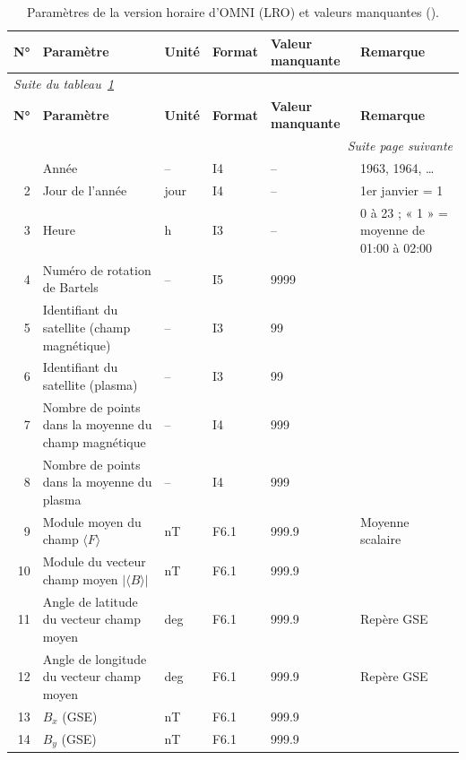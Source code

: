 \begingroup
\footnotesize
\setlength{\tabcolsep}{3pt}
\renewcommand{\arraystretch}{1.1}
\begin{longtable}{r p{5.0cm} p{2.0cm} l l p{3.3cm}}
\caption{Paramètres de la version horaire d'OMNI (LRO) et valeurs manquantes (\cite{OMNI_LRO_doc}).}
\label{tab:annexe_lro}\\
\hline
\textbf{N°} & \textbf{Paramètre} & \textbf{Unité} & \textbf{Format} & \textbf{Valeur manquante} & \textbf{Remarque} \\
\hline
\endfirsthead
\multicolumn{6}{l}{\textit{Suite du tableau~\ref{tab:annexe_lro}}} \\
\hline
\textbf{N°} & \textbf{Paramètre} & \textbf{Unité} & \textbf{Format} & \textbf{Valeur manquante} & \textbf{Remarque} \\
\hline
\endhead
\hline
\multicolumn{6}{r}{\textit{Suite page suivante}} \\
\endfoot
\hline
\endlastfoot
1 & Année & -- & I4 & -- & 1963, 1964, \dots \\
2 & Jour de l'année & jour & I4 & -- & 1er janvier = 1 \\
3 & Heure & h & I3 & -- & 0 à 23 ; « 1 » = moyenne de 01:00 à 02:00 \\
4 & Numéro de rotation de Bartels & -- & I5 & 9999 & \\
5 & Identifiant du satellite (champ magnétique) & -- & I3 & 99 & \\
6 & Identifiant du satellite (plasma) & -- & I3 & 99 & \\
7 & Nombre de points dans la moyenne du champ magnétique & -- & I4 & 999 & \\
8 & Nombre de points dans la moyenne du plasma & -- & I4 & 999 & \\
9 & Module moyen du champ $\langle F \rangle$ & nT & F6.1 & 999.9 & Moyenne scalaire \\
10 & Module du vecteur champ moyen $|\langle B \rangle|$ & nT & F6.1 & 999.9 & \\
11 & Angle de latitude du vecteur champ moyen & deg & F6.1 & 999.9 & Repère GSE \\
12 & Angle de longitude du vecteur champ moyen & deg & F6.1 & 999.9 & Repère GSE \\
13 & $B_x$ (GSE) & nT & F6.1 & 999.9 & \\
14 & $B_y$ (GSE) & nT & F6.1 & 999.9 & \\

\end{longtable}
